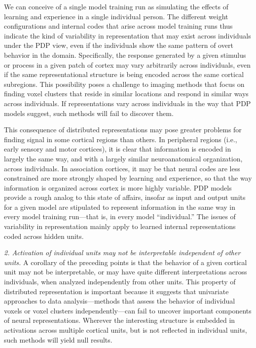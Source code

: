 We can conceive of a single model training run as simulating the effects of learning and experience in a single individual person. The different weight configurations and internal codes that arise across model training runs thus indicate the kind of variability in representation that may exist across individuals under the PDP view, even if the individuals show the same pattern of overt behavior in the domain. Specifically, the response generated by a given stimulus or process in a given patch of cortex may vary arbitrarily across individuals,  even if the same representational structure is being encoded across the same cortical subregions. This possibility poses a challenge to imaging methods that focus on finding voxel clusters that reside in similar locations and respond in similar ways across individuals. If representations vary across individuals in the way that PDP models suggest, such methods will fail to discover them.

This consequence of distributed representations may pose greater problems for finding signal in some cortical regions than others. In peripheral regions (i.e., early sensory and motor cortices), it is clear that information is encoded in largely the same way, and with a largely similar neuroanatomical organization, across individuals. In association cortices, it may be that neural codes are less constrained are more strongly shaped by learning and experience, so that the way information is organized across cortex is more highly variable. PDP models provide a rough analog to this state of affairs, insofar as input and output units for a given model are stipulated to represent information in the same way in every model training run---that is, in every model ``individual.'' The issues of variability in representation mainly apply to learned internal representations coded across hidden units.

{\em 2. Activation of individual units may not be interpretable independent of other units.} A corollary of the preceding points is that the behavior of a given cortical unit may not be interpretable, or may have quite different interpretations across individuals, when analyzed independently from other units. This property of distributed representation is important because it suggests that univariate approaches to data analysis---methods that assess the behavior of individual voxels or voxel clusters independently---can fail to uncover important components of neural representations. Wherever the interesting structure is embedded in activations across multiple cortical units, but is not reflected in individual units, such methods will yield null results.

